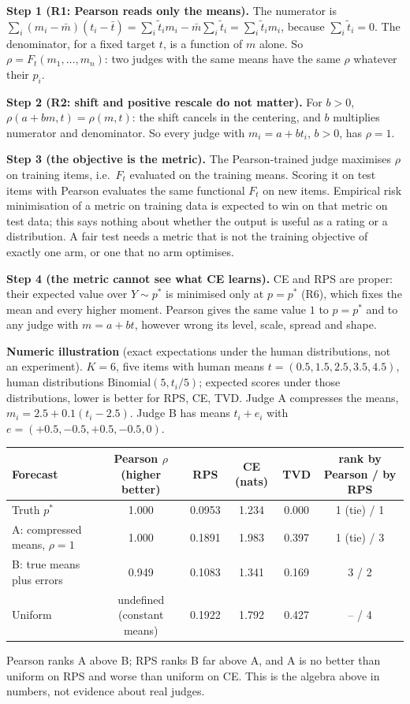 \documentclass[10.5pt]{article}
\begin{document}
\textbf{Step 1 (R1: Pearson reads only the means).} The numerator is $\sum_i(m_i-\bar m)(t_i-\bar t)=\sum_i\tilde t_i m_i-\bar m\sum_i\tilde t_i=\sum_i\tilde t_i m_i$, because $\sum_i\tilde t_i=0$. The denominator, for a fixed target $t$, is a function of $m$ alone. So $\rho=F_t(m_1,\dots,m_n)$: two judges with the same means have the same $\rho$ whatever their $p_i$.

\textbf{Step 2 (R2: shift and positive rescale do not matter).} For $b>0$, $\rho(a+bm,t)=\rho(m,t)$: the shift cancels in the centering, and $b$ multiplies numerator and denominator. So every judge with $m_i=a+bt_i$, $b>0$, has $\rho=1$.

\textbf{Step 3 (the objective is the metric).} The Pearson-trained judge maximises $\rho$ on training items, i.e.\ $F_t$ evaluated on the training means. Scoring it on test items with Pearson evaluates the same functional $F_t$ on new items. Empirical risk minimisation of a metric on training data is expected to win on that metric on test data; this says nothing about whether the output is useful as a rating or a distribution. A fair test needs a metric that is not the training objective of exactly one arm, or one that no arm optimises.

\textbf{Step 4 (the metric cannot see what CE learns).} CE and RPS are proper: their expected value over $Y\sim p^\ast$ is minimised only at $p=p^\ast$ (R6), which fixes the mean and every higher moment. Pearson gives the same value $1$ to $p=p^\ast$ and to any judge with $m=a+bt$, however wrong its level, scale, spread and shape.

\textbf{Numeric illustration} (exact expectations under the human distributions, not an experiment). $K=6$, five items with human means $t=(0.5,1.5,2.5,3.5,4.5)$, human distributions $\text{Binomial}(5,t_i/5)$; expected scores under those distributions, lower is better for RPS, CE, TVD. Judge A compresses the means, $m_i=2.5+0.1(t_i-2.5)$. Judge B has means $t_i+e_i$ with $e=(+0.5,-0.5,+0.5,-0.5,0)$.

{\small\begin{center}\begin{tabular}{@{}lccccc@{}}
\toprule
Forecast & Pearson $\rho$ (higher better) & RPS & CE (nats) & TVD & rank by Pearson / by RPS\\
\midrule
Truth $p^\ast$ & 1.000 & 0.0953 & 1.234 & 0.000 & 1 (tie) / 1\\
A: compressed means, $\rho=1$ & 1.000 & 0.1891 & 1.983 & 0.397 & 1 (tie) / 3\\
B: true means plus errors & 0.949 & 0.1083 & 1.341 & 0.169 & 3 / 2\\
Uniform & undefined (constant means) & 0.1922 & 1.792 & 0.427 & -- / 4\\
\bottomrule
\end{tabular}\end{center}}
Pearson ranks A above B; RPS ranks B far above A, and A is no better than uniform on RPS and worse than uniform on CE. This is the algebra above in numbers, not evidence about real judges.
\end{document}
